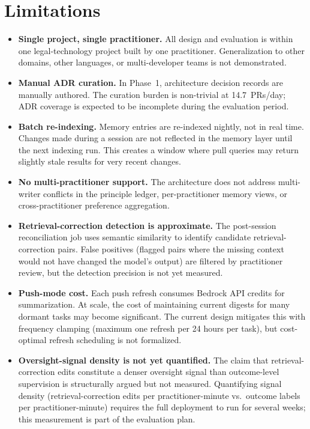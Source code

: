 \documentclass[11pt]{article}
\begin{document}
\section{Limitations}
\label{sec:limitations}

\begin{itemize}[leftmargin=*, nosep]
  \item \textbf{Single project, single practitioner.} All design and evaluation is within one legal-technology project built by one practitioner. Generalization to other domains, other languages, or multi-developer teams is not demonstrated.

  \item \textbf{Manual ADR curation.} In Phase~1, architecture decision records are manually authored. The curation burden is non-trivial at 14.7~PRs/day; ADR coverage is expected to be incomplete during the evaluation period.

  \item \textbf{Batch re-indexing.} Memory entries are re-indexed nightly, not in real time. Changes made during a session are not reflected in the memory layer until the next indexing run. This creates a window where pull queries may return slightly stale results for very recent changes.

  \item \textbf{No multi-practitioner support.} The architecture does not address multi-writer conflicts in the principle ledger, per-practitioner memory views, or cross-practitioner preference aggregation.

  \item \textbf{Retrieval-correction detection is approximate.} The post-session reconciliation job uses semantic similarity to identify candidate retrieval-correction pairs. False positives (flagged pairs where the missing context would not have changed the model's output) are filtered by practitioner review, but the detection precision is not yet measured.

  \item \textbf{Push-mode cost.} Each push refresh consumes Bedrock API credits for summarization. At scale, the cost of maintaining current digests for many dormant tasks may become significant. The current design mitigates this with frequency clamping (maximum one refresh per 24 hours per task), but cost-optimal refresh scheduling is not formalized.

  \item \textbf{Oversight-signal density is not yet quantified.} The claim that retrieval-correction edits constitute a denser oversight signal than outcome-level supervision is structurally argued but not measured. Quantifying signal density (retrieval-correction edits per practitioner-minute vs.\ outcome labels per practitioner-minute) requires the full deployment to run for several weeks; this measurement is part of the evaluation plan.
\end{itemize}
\end{document}
